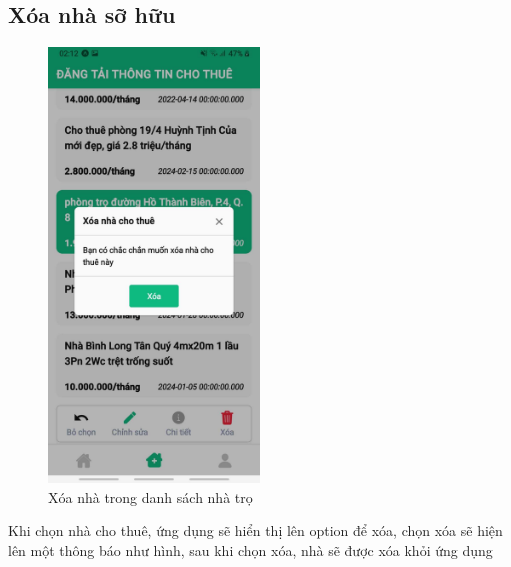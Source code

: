 \subsection{Xóa nhà sỡ hữu}
\begin{figure}[H]
    \centering
    \includegraphics[width=0.5\textwidth]{Images/app_image/app_1.jpg}
    \caption{Xóa nhà trong danh sách nhà trọ}
\end{figure}
Khi chọn nhà cho thuê, ứng dụng sẽ hiển thị lên option để xóa, chọn xóa sẽ hiện lên một thông báo như hình, sau khi chọn xóa, nhà sẽ được xóa khỏi ứng dụng
\newpage

